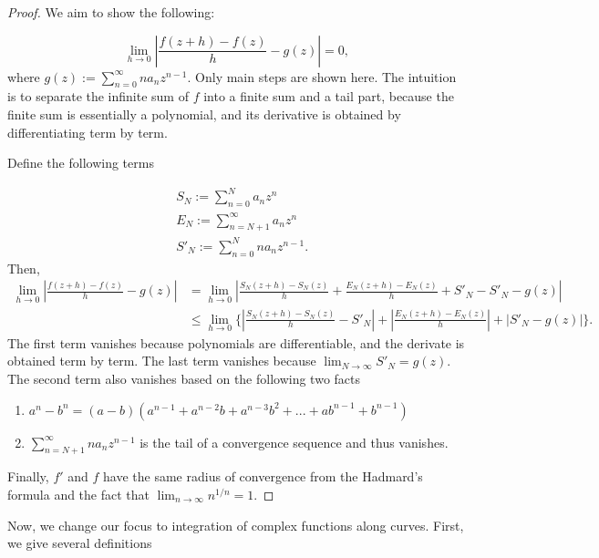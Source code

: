 \documentclass{article}
\begin{document}
\begin{proof}
We aim to show the following:

\begin{equation*} 
\lim_{h\rightarrow0}|\frac{f(z+h)-f(z)}{h}-g(z)|=0,
\end{equation*}
where $g(z):=\sum^\infty_{n=0}na_nz^{n-1}$. Only main steps are shown here. The intuition is to separate the infinite sum of $f$ into a finite sum and a tail part, because the finite sum is essentially a polynomial, and its derivative is obtained by differentiating term by term. 

Define the following terms

\begin{equation*}
\begin{aligned}
&S_N:=\sum^N_{n=0}a_nz^n\\
&E_N:=\sum^\infty_{n=N+1}a_nz^n\\
&S'_N:=\sum^N_{n=0}na_nz^{n-1}.
\end{aligned}
\end{equation*}
Then, 
\begin{equation*}
\begin{aligned}
\lim_{h\rightarrow0}|\frac{f(z+h)-f(z)}{h}-g(z)|&=\lim_{h\rightarrow0}|\frac{S_N(z+h)-S_N(z)}{h}+\frac{E_N(z+h)-E_N(z)}{h}+S'_N-S'_N-g(z)|\\
&\leq \lim_{h\rightarrow0}\{|\frac{S_N(z+h)-S_N(z)}{h}-S'_N|+|\frac{E_N(z+h)-E_N(z)}{h}|+|S'_N-g(z)|\}.
\end{aligned}
\end{equation*}
The first term vanishes because polynomials are differentiable, and the derivate is obtained term by term. The last term vanishes because $\lim_{N\rightarrow\infty}S'_N=g(z)$. The second term also vanishes based on the following two facts

\begin{enumerate}
\item
$a^n-b^n=(a-b)(a^{n-1}+a^{n-2}b+a^{n-3}b^2+...+ab^{n-1}+b^{n-1})$

\item
$\sum^\infty_{n=N+1}na_nz^{n-1}$ is the tail of a convergence sequence and thus vanishes.
\end{enumerate}

Finally, $f'$ and $f$ have the same radius of convergence from the Hadmard's formula and the fact that $\lim_{n\rightarrow\infty}n^{1/n}=1$.

\end{proof}

Now, we change our focus to integration of complex functions along curves. First, we give several definitions
\end{document}
